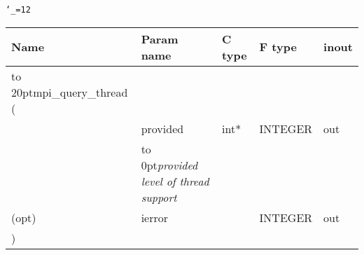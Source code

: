 \begingroup\tt\catcode`\_=12
\begin{tabular}{lllll}
\toprule
\textrm{Name}&\textrm{Param name}&\textrm{C type}&\textrm{F type}&\textrm{inout}\\
\midrule
\hbox to 20pt{mpi_query_thread (\hss} \\
&provided&int*&INTEGER&out\\ [-3pt]
&\hbox to 0pt{\footnotesize\sl provided level of thread support\hss}\\
(opt)&ierror&&INTEGER&out\\
)\\
\bottomrule
\end{tabular}
\endgroup

